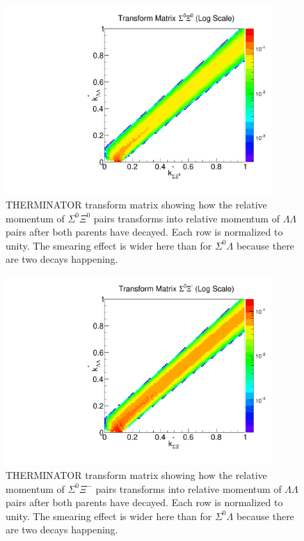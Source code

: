 \begin{figure}[hbt]
\begin{center}
\includegraphics[width=24pc]{Figures/TransformMatrices/2016-7-20-TransformMatrixSigmaXi0NormLog.pdf}
\end{center}
\caption[Transform matrix for $k^*_{\Sigma^0\Xi^0} \rightarrow k^*_{\Lambda\Lambda}$]{THERMINATOR \cite{Chojnacki:2011hb} transform matrix showing how the relative momentum of $\Sigma^0\Xi^0$ pairs transforms into relative momentum of $\Lambda\Lambda$ pairs after both parents have decayed. Each row is normalized to unity. The smearing effect is wider here than for $\Sigma^0\Lambda$ because there are two decays happening.}
\label{fig:TherminatorSX0}
\end{figure}

\begin{figure}[hbt]
\begin{center}
\includegraphics[width=24pc]{Figures/TransformMatrices/2016-7-20-TransformMatrixSigmaXiCNormLog.pdf}
\end{center}
\caption[Transform matrix for $k^*_{\Sigma^0\Xi^-} \rightarrow k^*_{\Lambda\Lambda}$]{THERMINATOR \cite{Chojnacki:2011hb} transform matrix showing how the relative momentum of $\Sigma^0\Xi^-$ pairs transforms into relative momentum of $\Lambda\Lambda$ pairs after both parents have decayed. Each row is normalized to unity. The smearing effect is wider here than for $\Sigma^0\Lambda$ because there are two decays happening.}
\label{fig:TherminatorSXc}
\end{figure}

